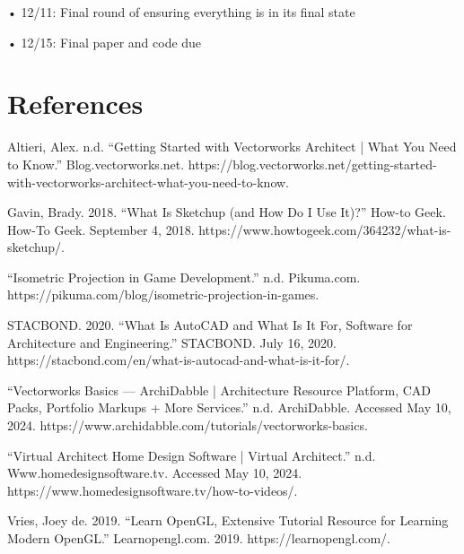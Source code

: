 \documentclass[10pt,twocolumn]{article}
\begin{document}
 • 12/11: Final round of ensuring everything is in its final state

 • 12/15: Final paper and code due


\section{References}
\begin{hangparas}{.25in}{1}
Altieri, Alex. n.d. “Getting Started with Vectorworks Architect | What You Need to Know.” Blog.vectorworks.net. https://blog.vectorworks.net/getting-started-with-vectorworks-architect-what-you-need-to-know.

Gavin, Brady. 2018. “What Is Sketchup (and How Do I Use It)?” How-to Geek. How-To Geek. September 4, 2018. https://www.howtogeek.com/364232/what-is-sketchup/.

“Isometric Projection in Game Development.” n.d. Pikuma.com. https://pikuma.com/blog/isometric-projection-in-games.

STACBOND. 2020. “What Is AutoCAD and What Is It For, Software for Architecture and Engineering.” STACBOND. July 16, 2020. https://stacbond.com/en/what-is-autocad-and-what-is-it-for/.

“Vectorworks Basics — ArchiDabble | Architecture Resource Platform, CAD Packs, Portfolio Markups + More Services.” n.d. ArchiDabble. Accessed May 10, 2024. https://www.archidabble.com/tutorials/vectorworks-basics.

“Virtual Architect Home Design Software | Virtual Architect.” n.d. Www.homedesignsoftware.tv. Accessed May 10, 2024. https://www.homedesignsoftware.tv/how-to-videos/.

Vries, Joey de. 2019. “Learn OpenGL, Extensive Tutorial Resource for Learning Modern OpenGL.” Learnopengl.com. 2019. https://learnopengl.com/.
\end{hangparas}
\end{document}
